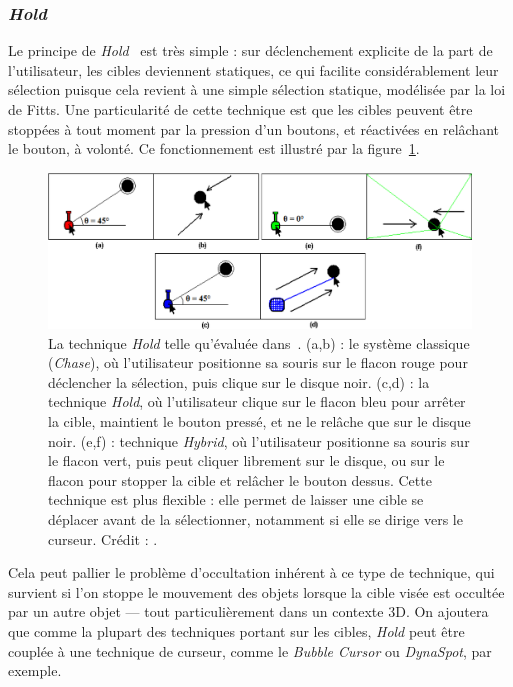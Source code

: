 	\subsubsection{\emph{Hold}}
	Le principe de \emph{Hold}~\cite{hajri2011moving} est très simple : sur déclenchement explicite de la part de l'utilisateur, les cibles deviennent statiques, ce qui facilite considérablement leur sélection puisque cela revient à une simple sélection statique, modélisée par la loi de Fitts. Une particularité de cette technique est que les cibles peuvent être stoppées à tout moment par la pression d'un boutons, et \og réactivées \fg{} en relâchant le bouton, à volonté. Ce fonctionnement est illustré par la figure~\ref{fig:hold}.
	
	\begin{figure}[!htb]
		\centering
		\includegraphics[width=\textwidth]{figures/ch2/hold}
		\caption[La technique \emph{Hold}]{La technique \emph{Hold} telle qu'évaluée dans~\cite{hajri2011moving}. (a,b) : le système classique (\emph{Chase}), où l'utilisateur positionne sa souris sur le flacon rouge pour déclencher la sélection, puis clique sur le disque noir. (c,d) : la technique \emph{Hold}, où l'utilisateur clique sur le flacon bleu pour arrêter la cible, maintient le bouton pressé, et ne le relâche que sur le disque noir. (e,f) : technique \emph{Hybrid}, où l'utilisateur positionne sa souris sur le flacon vert, puis peut cliquer librement sur le disque, ou sur le flacon pour stopper la cible et relâcher le bouton dessus. Cette technique est plus flexible : elle permet de laisser une cible se déplacer avant de la sélectionner, notamment si elle se dirige vers le curseur. Crédit : \cite{hajri2011moving}.}
		\label{fig:hold}
	\end{figure}
	
	Cela peut pallier le problème d'occultation inhérent à ce type de technique, qui survient si l'on stoppe le mouvement des objets lorsque la cible visée est occultée par un autre objet --- tout particulièrement dans un contexte 3D. On ajoutera que comme la plupart des techniques portant sur les cibles, \emph{Hold} peut être couplée à une technique de curseur, comme le \emph{Bubble Cursor} ou \emph{DynaSpot}, par exemple.
	
